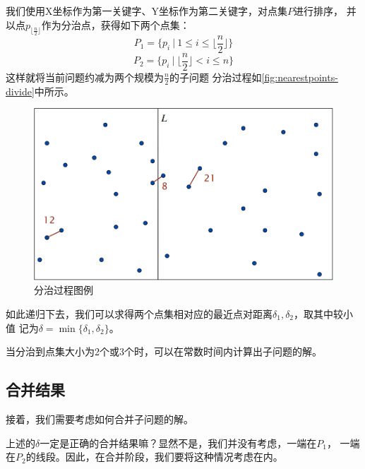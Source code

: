 我们使用X坐标作为第一关键字、Y坐标作为第二关键字，对点集$P$进行排序，
并以点$p_{\lfloor\frac{n}{2}\rfloor}$作为分治点，获得如下两个点集：
\begin{equation*}
	P_1 = \{p_i\ \big|\ 1 \le i \le \lfloor\frac{n}{2}\rfloor \}
\end{equation*}
\begin{equation*}
	P_2 = \{p_i\ \big|\ \lfloor\frac{n}{2}\rfloor < i \le n\}
\end{equation*}
这样就将当前问题约减为两个规模为$\frac{n}{2}$的子问题
分治过程如\autoref{fig:nearestpoints-divide}中所示。

\begin{figure}[htb]
	\centering
	\includegraphics[scale=0.5]{image/NearestPointsDivide.png}
  \caption{分治过程图例}\label{fig:nearestpoints-divide}
\end{figure}

如此递归下去，我们可以求得两个点集相对应的最近点对距离$\delta_1, \delta_2$，取其中较小值
记为$\delta = \min \{ \delta_1 , \delta_2 \}$。

当分治到点集大小为2个或3个时，可以在常数时间内计算出子问题的解。

\subsection{合并结果}

接着，我们需要考虑如何合并子问题的解。

上述的$\delta$一定是正确的合并结果嘛？显然不是，我们并没有考虑，一端在$P_1$，
一端在$P_2$的线段。因此，在合并阶段，我们要将这种情况考虑在内。

